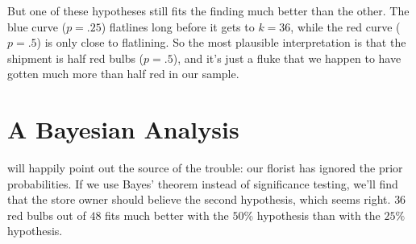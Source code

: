 \documentclass[justified]{tufte-book}
\theoremstyle{definition}
\theoremstyle{definition}
\theoremstyle{definition}
\theoremstyle{remark}
\begin{document}
But one of these hypotheses still fits the finding much better than the
other. The blue curve (\(p = .25\)) flatlines long before it gets to
\(k = 36\), while the red curve (\(p = .5\)) is only close to
flatlining. So the most plausible interpretation is that the shipment is
half red bulbs (\(p = .5\)), and it's just a fluke that we happen to
have gotten much more than half red in our sample.

\hypertarget{a-bayesian-analysis}{%
\section{A Bayesian Analysis}\label{a-bayesian-analysis}}

 will happily point out the source of the trouble:
our florist has ignored the prior probabilities. If we use Bayes'
theorem instead of significance testing, we'll find that the store owner
should believe the second hypothesis, which seems right. \(36\) red
bulbs out of \(48\) fits much better with the \(50\%\) hypothesis than
with the \(25\%\) hypothesis.
\end{document}
